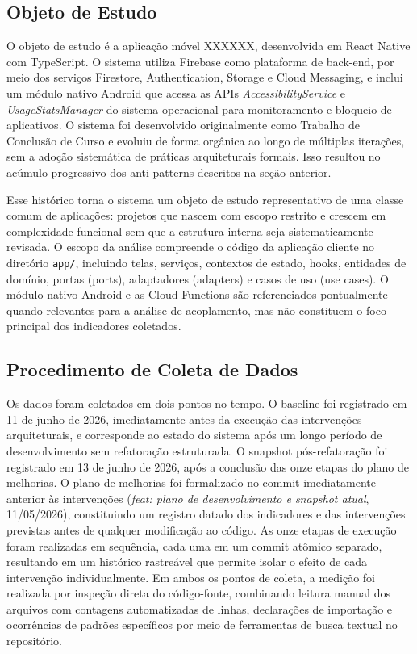 \documentclass[sigconf,anonymous]{acmart}
\begin{document}
\subsection{Objeto de Estudo}

O objeto de estudo é a aplicação móvel XXXXXX, desenvolvida em React Native com TypeScript. O sistema utiliza Firebase como plataforma de back-end, por meio dos serviços Firestore, Authentication, Storage e Cloud Messaging, e inclui um módulo nativo Android que acessa as APIs \textit{AccessibilityService} e \textit{UsageStatsManager} do sistema operacional para monitoramento e bloqueio de aplicativos. O sistema foi desenvolvido originalmente como Trabalho de Conclusão de Curso e evoluiu de forma orgânica ao longo de múltiplas iterações, sem a adoção sistemática de práticas arquiteturais formais. Isso resultou no acúmulo progressivo dos anti-patterns descritos na seção anterior.

Esse histórico torna o sistema um objeto de estudo representativo de uma classe comum de aplicações: projetos que nascem com escopo restrito e crescem em complexidade funcional sem que a estrutura interna seja sistematicamente revisada. O escopo da análise compreende o código da aplicação cliente no diretório \texttt{app/}, incluindo telas, serviços, contextos de estado, hooks, entidades de domínio, portas (ports), adaptadores (adapters) e casos de uso (use cases). O módulo nativo Android e as Cloud Functions são referenciados pontualmente quando relevantes para a análise de acoplamento, mas não constituem o foco principal dos indicadores coletados.

\subsection{Procedimento de Coleta de Dados}

Os dados foram coletados em dois pontos no tempo. O baseline foi registrado em 11 de junho de 2026, imediatamente antes da execução das intervenções arquiteturais, e corresponde ao estado do sistema após um longo período de desenvolvimento sem refatoração estruturada. O snapshot pós-refatoração foi registrado em 13 de junho de 2026, após a conclusão das onze etapas do plano de melhorias. O plano de melhorias foi formalizado no commit imediatamente anterior às intervenções (\textit{feat: plano de desenvolvimento e snapshot atual}, 11/05/2026), constituindo um registro datado dos indicadores e das intervenções previstas antes de qualquer modificação ao código. As onze etapas de execução foram realizadas em sequência, cada uma em um commit atômico separado, resultando em um histórico rastreável que permite isolar o efeito de cada intervenção individualmente. Em ambos os pontos de coleta, a medição foi realizada por inspeção direta do código-fonte, combinando leitura manual dos arquivos com contagens automatizadas de linhas, declarações de importação e ocorrências de padrões específicos por meio de ferramentas de busca textual no repositório.
\end{document}
